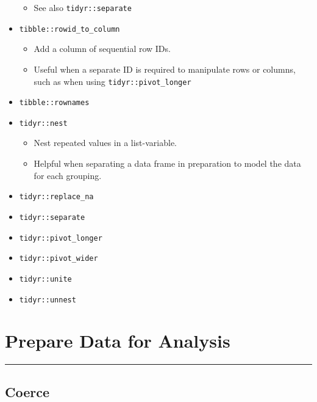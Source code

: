 \documentclass[
]{book}
\providecommand{\tightlist}{%
  \setlength{\itemsep}{0pt}\setlength{\parskip}{0pt}}
\begin{document}
\begin{itemize}
  \begin{itemize}
  \tightlist
  \item
    See also \texttt{tidyr::separate}
  \end{itemize}
\item
  \texttt{tibble::rowid\_to\_column}

  \begin{itemize}
  \tightlist
  \item
    Add a column of sequential row IDs.
  \item
    Useful when a separate ID is required to manipulate rows or columns, such as when using \texttt{tidyr::pivot\_longer}
  \end{itemize}
\item
  \texttt{tibble::rownames}
\item
  \texttt{tidyr::nest}

  \begin{itemize}
  \tightlist
  \item
    Nest repeated values in a list-variable.
  \item
    Helpful when separating a data frame in preparation to model the data for each grouping.
  \end{itemize}
\item
  \texttt{tidyr::replace\_na}
\item
  \texttt{tidyr::separate}
\item
  \texttt{tidyr::pivot\_longer}
\item
  \texttt{tidyr::pivot\_wider}
\item
  \texttt{tidyr::unite}
\item
  \texttt{tidyr::unnest}
\end{itemize}

\hypertarget{prepare-data-for-analysis}{%
\section{Prepare Data for Analysis}\label{prepare-data-for-analysis}}

\begin{center}\rule{0.5\linewidth}{0.5pt}\end{center}

\hypertarget{coerce}{%
\subsection{Coerce}\label{coerce}}
\end{document}

